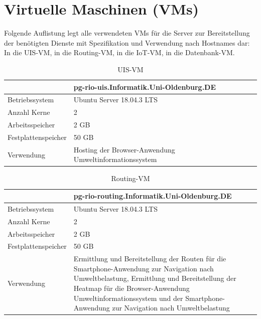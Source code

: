\section{Virtuelle Maschinen (VMs)}
\label{sec:vms}
Folgende Auflistung legt alle verwendeten VMs für die Server zur Bereitstellung der benötigten Dienste mit Spezifikation und Verwendung nach Hostnames dar:
In  die UIS-VM,
in  die Routing-VM,
in  die IoT-VM,
in  die Datenbank-VM.\par\bigskip
\begin{table}[H]\caption{UIS-VM}\label{tbl:vmuis}
\begin{tabularx}{\textwidth}{|l|X|}
	\hline 
	& \textbf{pg-rio-uis.Informatik.Uni-Oldenburg.DE}\\
	\hline Betriebssystem
	&  Ubuntu Server 18.04.3 LTS\\ 
	\hline Anzahl Kerne
	&  2\\ 
	\hline Arbeitsspeicher 
	&  2 GB\\ 
	\hline Festplattenspeicher
	&  50 GB\\ 
	\hline Verwendung 
	&  Hosting der Browser-Anwendung Umweltinformationssystem\\ 
	\hline
\end{tabularx}
\end{table}
\par\bigskip 

\begin{table}[H]\caption{Routing-VM}\label{tbl:vmrouting}
\begin{tabularx}{\textwidth}{|l|X|}
	\hline
	&\textbf{pg-rio-routing.Informatik.Uni-Oldenburg.DE}\\ 
	\hline Betriebssystem
	&  Ubuntu Server 18.04.3 LTS\\ 
	\hline Anzahl Kerne
	&  2\\ 
	\hline Arbeitsspeicher 
	&  2 GB\\ 
	\hline Festplattenspeicher
	&  50 GB\\ 
	\hline Verwendung 
	&  Ermittlung und Bereitstellung der Routen für die Smartphone-Anwendung zur Navigation nach Umweltbelastung, Ermittlung und Bereitstellung der Heatmap für die Browser-Anwendung Umweltinformationssystem und der Smartphone-Anwendung zur Navigation nach Umweltbelastung\\ 
	\hline 
\end{tabularx}
\end{table}
\par\bigskip

